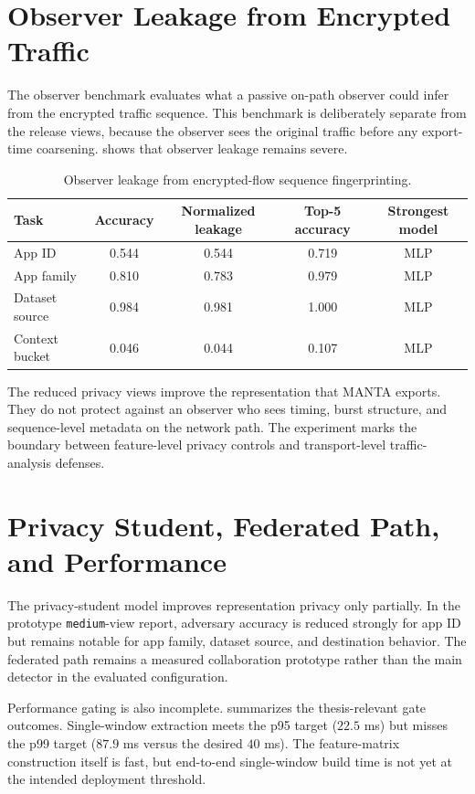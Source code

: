 \section{Observer Leakage from Encrypted Traffic}
The observer benchmark evaluates what a passive on-path observer could infer from the encrypted
traffic sequence. This benchmark is deliberately separate from the release views, because the
observer sees the original traffic before any export-time coarsening.  shows that
observer leakage remains severe.

\begin{table}[htbp]
  \centering
  \caption{Observer leakage from encrypted-flow sequence fingerprinting.}
  \label{tab:observer}
  \begin{tabular}{lcccc}
    \toprule
    Task & Accuracy & Normalized leakage & Top-5 accuracy & Strongest model \\
    \midrule
    App ID & 0.544 & 0.544 & 0.719 & MLP \\
    App family & 0.810 & 0.783 & 0.979 & MLP \\
    Dataset source & 0.984 & 0.981 & 1.000 & MLP \\
    Context bucket & 0.046 & 0.044 & 0.107 & MLP \\
    \bottomrule
  \end{tabular}
\end{table}

The reduced privacy views improve the representation that MANTA exports. They do not protect
against an observer who sees timing, burst structure, and sequence-level metadata on the network
path. The experiment marks the boundary between feature-level privacy controls and transport-level
traffic-analysis defenses.

\section{Privacy Student, Federated Path, and Performance}
The privacy-student model improves representation privacy only partially. In the prototype
\texttt{medium}-view report, adversary accuracy is reduced strongly for app ID but remains notable
for app family, dataset source, and destination behavior. The federated path remains a measured
collaboration prototype rather than the main detector in the evaluated configuration.

Performance gating is also incomplete.  summarizes the thesis-relevant gate
outcomes. Single-window extraction meets the p95 target (\(22.5\) ms) but misses the p99 target
(\(87.9\) ms versus the desired \(40\) ms). The feature-matrix construction itself is fast, but
end-to-end single-window build time is not yet at the intended deployment threshold.

